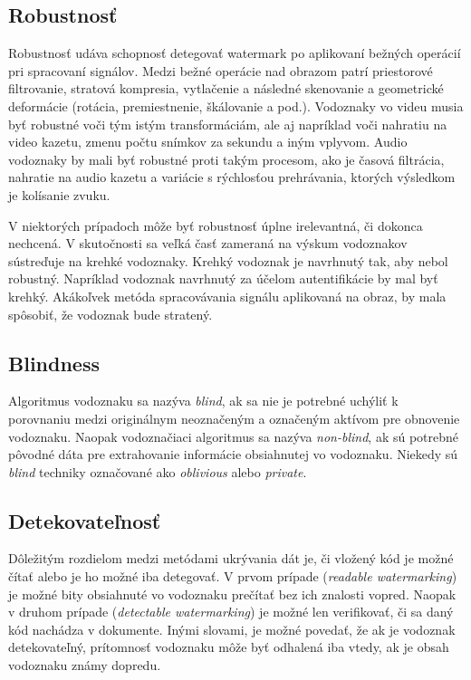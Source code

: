 \subsection{Robustnosť}
Robustnosť udáva schopnosť detegovať watermark po aplikovaní bežných operácií pri spracovaní signálov. Medzi bežné operácie nad obrazom patrí priestorové filtrovanie, stratová kompresia, vytlačenie a následné skenovanie a geometrické deformácie (rotácia, premiestnenie, škálovanie a pod.). Vodoznaky vo videu musia byť robustné voči tým istým transformáciám, ale aj napríklad voči nahratiu na video kazetu, zmenu počtu snímkov za sekundu a iným vplyvom. Audio vodoznaky by mali byť robustné proti takým procesom, ako je časová filtrácia, nahratie na audio kazetu a variácie s rýchlosťou prehrávania, ktorých výsledkom je kolísanie zvuku.

V niektorých prípadoch môže byť robustnosť úplne irelevantná, či dokonca nechcená. V skutočnosti sa veľká časť zameraná na výskum vodoznakov sústreďuje na krehké vodoznaky. Krehký vodoznak je navrhnutý tak, aby nebol robustný. Napríklad vodoznak navrhnutý za účelom autentifikácie by mal byť krehký. Akákoľvek metóda spracovávania signálu aplikovaná na obraz, by mala spôsobiť, že vodoznak bude stratený. \cite{Cox}

\subsection{Blindness}
Algoritmus vodoznaku sa nazýva {\it blind}, ak sa nie je potrebné uchýliť k porovnaniu medzi originálnym neoznačeným a označeným aktívom pre obnovenie vodoznaku. Naopak vodoznačiaci algoritmus sa nazýva {\it non-blind}, ak sú potrebné pôvodné dáta pre extrahovanie informácie obsiahnutej vo vodoznaku. Niekedy sú {\it blind} techniky označované ako {\it oblivious} alebo {\it private}. \cite{Barni}

\subsection{Detekovateľnosť}
Dôležitým rozdielom medzi metódami ukrývania dát je, či vložený kód je možné čítať alebo je ho možné iba detegovať. V prvom prípade ({\it readable watermarking}) je možné bity obsiahnuté vo vodoznaku prečítať bez ich znalosti vopred. Naopak v druhom prípade ({\it detectable watermarking}) je možné len verifikovať, či sa daný kód nachádza v dokumente. Inými slovami, je možné povedať, že ak je vodoznak detekovateľný, prítomnosť vodoznaku môže byť odhalená iba vtedy, ak je obsah vodoznaku známy dopredu. \cite{Barni}

